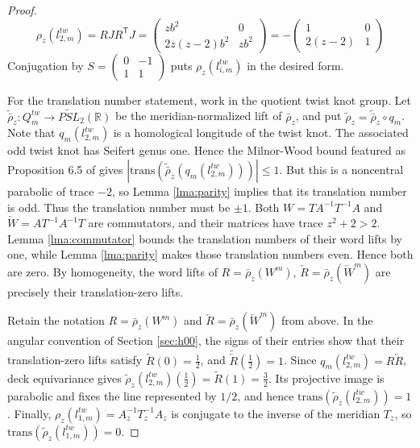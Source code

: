 \documentclass{article}
\theoremstyle{plain}
\theoremstyle{definition}
\theoremstyle{plain}
\theoremstyle{plain}
\theoremstyle{plain}
\theoremstyle{remark}
\theoremstyle{remark}
\theoremstyle{plain}
\theoremstyle{plain}
\theoremstyle{plain}
\theoremstyle{plain}
\begin{document}
\begin{proof}
\begin{equation*}
	\rho_z(l_{2,m}^{tw}) = RJR^{\mathsf T}J = \begin{pmatrix}zb^2&0\\2z(z-2)b^2&zb^2\end{pmatrix} = -\begin{pmatrix}1&0\\2(z-2)&1\end{pmatrix}
\end{equation*}
Conjugation by $S=\left(\begin{smallmatrix}0&-1\\1&1\end{smallmatrix}\right)$ puts $\rho_z(l_{i,m}^{tw})$ in the desired form. 

\medskip

For the translation number statement, work in the quotient twist knot group. Let $\widetilde{\bar\rho}_z: Q_m^{tw} \to \widetilde{PSL}_2(\mathbb R)$ be the meridian-normalized lift of $\bar\rho_z$, and put $\widetilde\rho_z = \widetilde{\bar\rho}_z \circ q_m$. Note that $q_m(l_{2,m}^{tw})$ is a homological longitude of the twist knot. The associated odd twist knot has Seifert genus one. Hence the Milnor-Wood bound featured as Proposition 6.5 of \cite{cullerdunfield} gives $|\mathrm{trans}(\widetilde{\bar\rho}_z(q_m(l_{2,m}^{tw})))| \leq 1$. But this is a noncentral parabolic of trace $-2$, so Lemma \ref{lma:parity} implies that its translation number is odd. Thus the translation number must be $\pm 1$. Both $W = TA^{-1}T^{-1}A$ and $\overleftarrow W=AT^{-1}A^{-1}T$ are commutators, and their matrices have trace $z^2+2 > 2$. Lemma \ref{lma:commutator} bounds the translation numbers of their word lifts by one, while Lemma \ref{lma:parity} makes those translation numbers even. Hence both are zero. By homogeneity, the word lifts of $R=\bar\rho_z(W^m)$, $\overleftarrow R = \bar\rho_z(\overleftarrow W^m)$ are precisely their translation-zero lifts.

\medskip

Retain the notation $R = \bar\rho_z(W^m)$ and $\overleftarrow R = \bar\rho_z(\overleftarrow W^m)$ from above. In the angular convention of Section \ref{sec:h00}, the signs of their entries show that their translation-zero lifts satisfy $\widetilde R(0) = \frac12$, and $\widetilde{\overleftarrow R}(\frac12) = 1$. Since $q_m(l_{2,m}^{tw}) = R\overleftarrow R$, deck equivariance gives $\widetilde\rho_z(l_{2,m}^{tw})(\frac12) = \widetilde R(1) = \frac32$. Its projective image is parabolic and fixes the line represented by $1/2$, and hence $\mathrm{trans}(\widetilde\rho_z(l_{2,m}^{tw})) = 1$. Finally, $\rho_z(l_{1,m}^{tw}) = A_z^{-1}T_z^{-1}A_z$ is conjugate to the inverse of the meridian $T_z$, so $\mathrm{trans}(\widetilde\rho_z(l_{1,m}^{tw})) = 0$. 
\end{proof}
\end{document}

